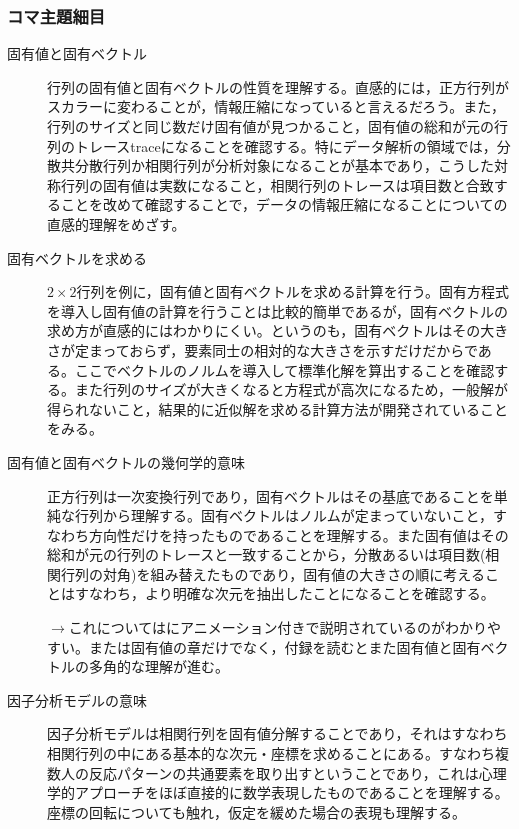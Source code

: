 \subsubsection{コマ主題細目}
\begin{description}
    \item[固有値と固有ベクトル] 
    行列の固有値と固有ベクトルの性質を理解する。直感的には，正方行列がスカラーに変わることが，情報圧縮になっていると言えるだろう。また，行列のサイズと同じ数だけ固有値が見つかること，固有値の総和が元の行列のトレースtraceになることを確認する。特にデータ解析の領域では，分散共分散行列か相関行列が分析対象になることが基本であり，こうした対称行列の固有値は実数になること，相関行列のトレースは項目数と合致することを改めて確認することで，データの情報圧縮になることについての直感的理解をめざす。
    \item[固有ベクトルを求める] 
    $2\times2$行列を例に，固有値と固有ベクトルを求める計算を行う。固有方程式を導入し固有値の計算を行うことは比較的簡単であるが，固有ベクトルの求め方が直感的にはわかりにくい。というのも，固有ベクトルはその大きさが定まっておらず，要素同士の相対的な大きさを示すだけだからである。ここでベクトルのノルムを導入して標準化解を算出することを確認する。また行列のサイズが大きくなると方程式が高次になるため，一般解が得られないこと，結果的に近似解を求める計算方法が開発されていることをみる。
    \item[固有値と固有ベクトルの幾何学的意味] 
    正方行列は一次変換行列であり，固有ベクトルはその基底であることを単純な行列から理解する。固有ベクトルはノルムが定まっていないこと，すなわち方向性だけを持ったものであることを理解する。また固有値はその総和が元の行列のトレースと一致することから，分散あるいは項目数(相関行列の対角)を組み替えたものであり，固有値の大きさの順に考えることはすなわち，より明確な次元を抽出したことになることを確認する。

    \begin{flushright}
        $\to$これについては\citet{平岡和幸2004-10-01}にアニメーション付きで説明されているのがわかりやすい。また\citet{長沼伸一郎2011-09-20}は固有値の章だけでなく，付録を読むとまた固有値と固有ベクトルの多角的な理解が進む。
    \end{flushright}

    \item[因子分析モデルの意味] 
    因子分析モデルは相関行列を固有値分解することであり，それはすなわち相関行列の中にある基本的な次元・座標を求めることにある。すなわち複数人の反応パターンの共通要素を取り出すということであり，これは心理学的アプローチをほぼ直接的に数学表現したものであることを理解する。座標の回転についても触れ，仮定を緩めた場合の表現も理解する。
\end{description}
